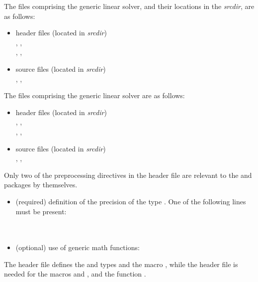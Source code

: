 The files comprising the {\dense} generic linear solver, and their locations
in the {\sundials} {\em srcdir}, are as follows:
\begin{itemize}
\item header files (located in {\em srcdir})\\
  , , \\
  , ,  
\item source files (located in {\em srcdir})\\
  , , 
\end{itemize}
The files comprising the {\band} generic linear solver are as follows:
\begin{itemize}
\item header files (located in {\em srcdir})\\
  , , \\
  , ,  
\item source files (located in {\em srcdir})\\
  , , 
\end{itemize}
Only two of the preprocessing directives in the header file  
are relevant to the {\dense} and {\band} packages by themselves.
\begin{itemize}
\item (required) definition of the precision of the {\sundials} type . 
  One of the following lines must be present:\\
  \\
  \\
\item (optional) use of generic math functions:
\end{itemize}
The  header file defines the {\sundials}  and
 types and the macro , while the 
header file is needed for the macros  and , and the
function .

